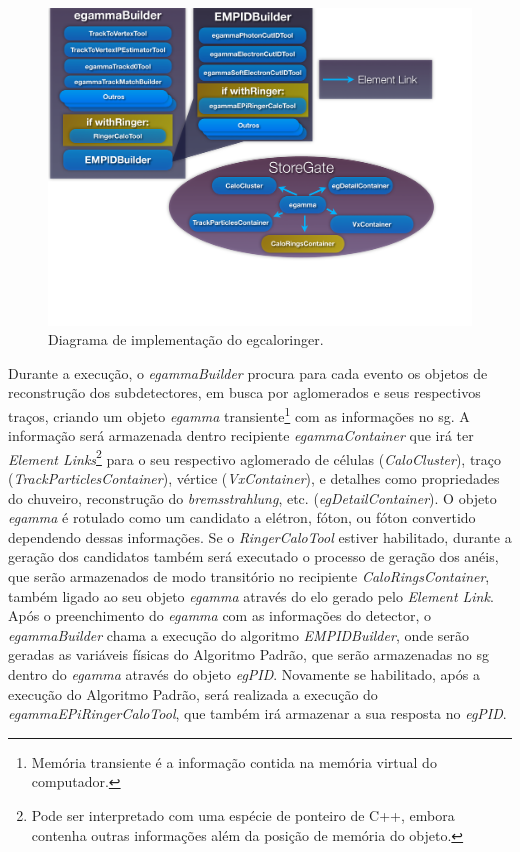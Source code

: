 \begin{figure}[ht!]
\label{fig:implementacao_ringer}
\centering
\includegraphics[width=1.0\textwidth]{imagens/implementacao_ringer.pdf}
\caption[Diagrama de implementação do \protect\gls{egcaloringer}]{Diagrama de
implementação do \gls{egcaloringer}.}
\end{figure}

Durante a execução, o \emph{egammaBuilder}
procura para cada evento os objetos de reconstrução dos subdetectores,
em busca por aglomerados e seus respectivos traços, criando um objeto 
\emph{egamma} transiente\footnote{Memória transiente é a informação contida na memória 
virtual do computador.} com as informações no \gls{sg}. A informação será
armazenada dentro recipiente \emph{egammaContainer} que irá ter \emph{Element
Links}\footnote{Pode ser interpretado com uma espécie de ponteiro de C++, embora
contenha outras informações além da posição de memória do objeto.} para o seu
respectivo aglomerado de células (\emph{CaloCluster}), traço
(\emph{TrackParticlesContainer}), vértice (\emph{VxContainer}), e detalhes como
propriedades do chuveiro, reconstrução do \emph{bremsstrahlung}, etc. (\emph{egDetailContainer}). 
O objeto \emph{egamma} é rotulado como um candidato a elétron, fóton, ou 
fóton convertido dependendo dessas informações. Se o \emph{RingerCaloTool}
estiver habilitado, durante a geração dos candidatos também será executado o
processo de geração dos anéis, que serão armazenados de modo transitório no
recipiente \emph{CaloRingsContainer}, também ligado ao seu objeto \emph{egamma}
através do elo gerado pelo \emph{Element Link}. Após o preenchimento do
\emph{egamma} com as informações do detector, o \emph{egammaBuilder} chama a
execução do algoritmo \emph{EMPIDBuilder}, onde serão geradas as variáveis 
físicas do Algoritmo Padrão, que serão armazenadas no \gls{sg} dentro do
\emph{egamma} através do objeto \emph{egPID}. Novamente se habilitado, após a
execução do Algoritmo Padrão, será realizada a execução do
\emph{egammaEPiRingerCaloTool}, que também irá armazenar a sua resposta no
\emph{egPID}.

